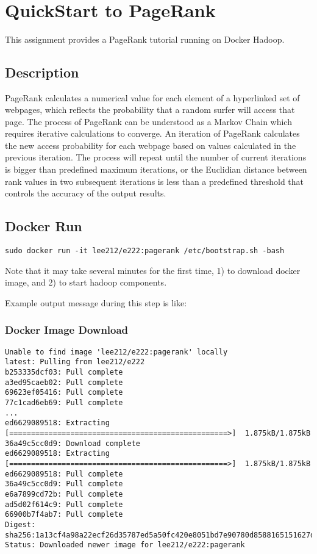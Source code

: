 \MDNAME\

\section{QuickStart to PageRank}

This assignment provides a PageRank tutorial running on Docker Hadoop.

\subsection{Description}

PageRank calculates a numerical value for each element of a hyperlinked
set of webpages, which reflects the probability that a random surfer
will access that page. The process of PageRank can be understood as a
Markov Chain which requires iterative calculations to converge. An
iteration of PageRank calculates the new access probability for each
webpage based on values calculated in the previous iteration. The
process will repeat until the number of current iterations is bigger
than predefined maximum iterations, or the Euclidian distance between
rank values in two subsequent iterations is less than a predefined
threshold that controls the accuracy of the output results.

\subsection{Docker Run}

\texttt{sudo\ docker\ run\ -it\ lee212/e222:pagerank\ /etc/bootstrap.sh\ -bash}

Note that it may take several minutes for the first time, 1) to download
docker image, and 2) to start hadoop components.

Example output message during this step is like:

\subsubsection{Docker Image Download}

\begin{lstlisting}
Unable to find image 'lee212/e222:pagerank' locally
latest: Pulling from lee212/e222
b253335dcf03: Pull complete
a3ed95caeb02: Pull complete
69623ef05416: Pull complete
77c1cad6eb69: Pull complete
...
ed6629089518: Extracting [==================================================>]  1.875kB/1.875kB
36a49c5cc0d9: Download complete
ed6629089518: Extracting [==================================================>]  1.875kB/1.875kB
ed6629089518: Pull complete
36a49c5cc0d9: Pull complete
e6a7899cd72b: Pull complete
ad5d02f614c9: Pull complete
66900b7f4ab7: Pull complete
Digest: sha256:1a13cf4a98a22ecf26d35787ed5a50fc420e8051bd7e90780d8588165151627d
Status: Downloaded newer image for lee212/e222:pagerank
\end{lstlisting}

